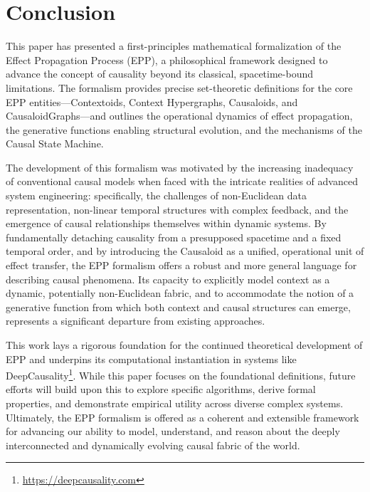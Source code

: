 \section[Conclusion]{Conclusion} 
\label{sec:conclusion}

This paper has presented a first-principles mathematical formalization of the Effect Propagation Process (EPP), a philosophical framework designed to advance the concept of causality beyond its classical, spacetime-bound limitations. The formalism provides precise set-theoretic definitions for the core EPP entities—Contextoids, Context Hypergraphs, Causaloids, and CausaloidGraphs—and outlines the operational dynamics of effect propagation, the generative functions enabling structural evolution, and the mechanisms of the Causal State Machine.

The development of this formalism was motivated by the increasing inadequacy of conventional causal models when faced with the intricate realities of advanced system engineering: specifically, the challenges of non-Euclidean data representation, non-linear temporal structures with complex feedback, and the emergence of causal relationships themselves within dynamic systems. By fundamentally detaching causality from a presupposed spacetime and a fixed temporal order, and by introducing the Causaloid as a unified, operational unit of effect transfer, the EPP formalism offers a robust and more general language for describing causal phenomena. Its capacity to explicitly model context as a dynamic, potentially non-Euclidean fabric, and to accommodate the notion of a generative function from which both context and causal structures can emerge, represents a significant departure from existing approaches.

This work lays a rigorous foundation for the continued theoretical development of EPP and underpins its computational instantiation in systems like DeepCausality\footnote{\url{https://deepcausality.com}}. While this paper focuses on the foundational definitions, future efforts will build upon this to explore specific algorithms, derive formal properties, and demonstrate empirical utility across diverse complex systems. Ultimately, the EPP formalism is offered as a coherent and extensible framework for advancing our ability to model, understand, and reason about the deeply interconnected and dynamically evolving causal fabric of the world.